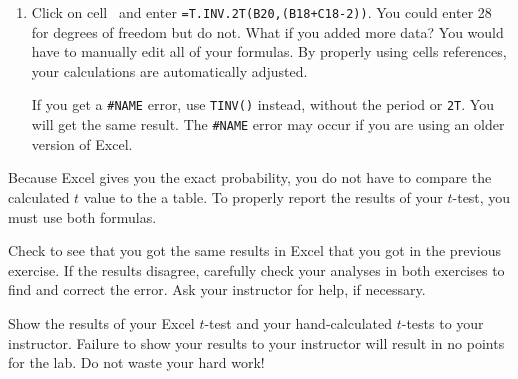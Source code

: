 \documentclass[12pt]{exam}
\newcommand*\xcell[1]{cell~\liningnum{#1}}
\begin{document}
\begin{enumerate}[resume]
	\item Click on \xcell{B21} and enter \texttt{=T.INV.2T(B20,(B18+C18-2))}. You could enter 28 for degrees of freedom but do not. What if you added more data? You would have to manually edit all of your formulas. By properly using cells references, your calculations are automatically adjusted. 
	
	If you get a \texttt{\#NAME} error, use \texttt{TINV()} instead, without the period or \texttt{2T}. You will get the same result. The \texttt{\#NAME} error may occur if you are using an older version of Excel. 
\end{enumerate}
	
Because Excel gives you the exact probability, you do not have to compare the calculated $t$ value to the a table. To properly report the results of your $t$-test, you must use both formulas. 

\begin{questions}

\question
Check to see that you got the same results in Excel that you got in the previous exercise. If the results disagree, carefully check your analyses in both exercises to find and correct the error. Ask your instructor for help, if necessary.

\question[Checkout]
Show the results of your Excel $t$-test and your hand-calculated $t$-tests to your instructor. Failure to show your results to your instructor will result in no points for the lab. Do not waste your hard work!

\end{questions}
\end{document}
